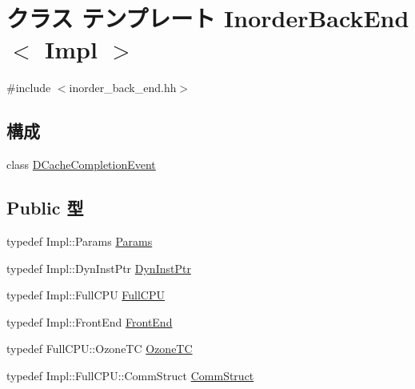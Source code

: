 \hypertarget{classInorderBackEnd}{
\section{クラス テンプレート InorderBackEnd$<$ Impl $>$}
\label{classInorderBackEnd}
}


{\ttfamily \#include $<$inorder\_\-back\_\-end.hh$>$}\subsection*{構成}
\begin{DoxyCompactItemize}
\item 
class \hyperlink{classInorderBackEnd_1_1DCacheCompletionEvent}{DCacheCompletionEvent}
\end{DoxyCompactItemize}
\subsection*{Public 型}
\begin{DoxyCompactItemize}
\item 
typedef Impl::Params \hyperlink{classInorderBackEnd_a818e103eae798a24a06a0a34631849ea}{Params}
\item 
typedef Impl::DynInstPtr \hyperlink{classInorderBackEnd_a028ce10889c5f6450239d9e9a7347976}{DynInstPtr}
\item 
typedef Impl::FullCPU \hyperlink{classInorderBackEnd_a90ba84e54618cc07f2e8f05e046cb5ce}{FullCPU}
\item 
typedef Impl::FrontEnd \hyperlink{classInorderBackEnd_abe8e1d8243582d5024a1076f6091d9fe}{FrontEnd}
\item 
typedef FullCPU::OzoneTC \hyperlink{classInorderBackEnd_abb1fee810c0fc9d68df56bdf67688be8}{OzoneTC}
\item 
typedef Impl::FullCPU::CommStruct \hyperlink{classInorderBackEnd_a82fb3c7183ba777a05c510ab2fbcfb82}{CommStruct}
\end{DoxyCompactItemize}
